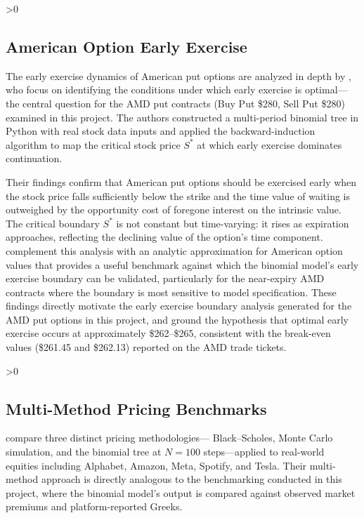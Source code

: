 \documentclass[12pt, letterpaper]{article}
\let\oldsubsection\subsection
\renewcommand{\subsection}{%
  \ifnum\value{subsection}>0 \clearpage\fi
  \oldsubsection
}
\begin{document}
\subsection{American Option Early Exercise}

The early exercise dynamics of American put options are analyzed in
depth by \citet{Mou2022}, who focus on identifying the conditions
under which early exercise is optimal---the central question for the
AMD put contracts (Buy Put \$280, Sell Put \$280) examined in this
project. The authors constructed a multi-period binomial tree in
Python with real stock data inputs and applied the backward-induction
algorithm to map the critical stock price $S^{*}$ at which early
exercise dominates continuation.

Their findings confirm that American put options should be exercised
early when the stock price falls sufficiently below the strike and the
time value of waiting is outweighed by the opportunity cost of foregone
interest on the intrinsic value. The critical boundary $S^{*}$ is not
constant but time-varying: it rises as expiration approaches,
reflecting the declining value of the option's time component.
\citet{BaroneAdesi1987} complement this analysis with an analytic
approximation for American option values that provides a useful
benchmark against which the binomial model's early exercise boundary
can be validated, particularly for the near-expiry AMD contracts where
the boundary is most sensitive to model specification. These findings
directly motivate the early exercise boundary analysis generated for
the AMD put options in this project, and ground the hypothesis that
optimal early exercise occurs at approximately \$262--\$265, consistent
with the break-even values (\$261.45 and \$262.13) reported on the AMD
trade tickets.

\subsection{Multi-Method Pricing Benchmarks}

\citet{Zhang2023} compare three distinct pricing methodologies---
Black--Scholes, Monte Carlo simulation, and the binomial tree at
$N = 100$ steps---applied to real-world equities including Alphabet,
Amazon, Meta, Spotify, and Tesla. Their multi-method approach is
directly analogous to the benchmarking conducted in this project,
where the binomial model's output is compared against observed market
premiums and platform-reported Greeks.
\end{document}
